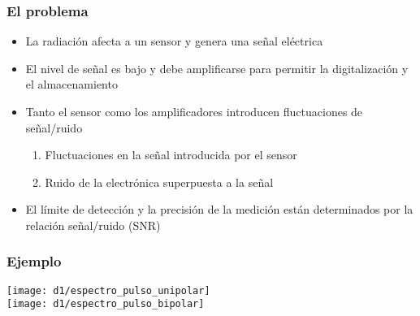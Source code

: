 \documentclass{beamer}
\begin{document}
\begin{frame}
\frametitle{El problema}
\begin{alertblock}{}
\begin{itemize}[<+->]
\item La radiaci\'on afecta a un sensor y genera una señal el\'ectrica

\item El nivel de señal es bajo y debe amplificarse para permitir la digitalizaci\'on y
el almacenamiento

\item Tanto el sensor como los amplificadores introducen fluctuaciones de señal/ruido
\begin{enumerate}
\item Fluctuaciones en la señal introducida por el sensor
\item Ruido de la electr\'onica superpuesta a la señal
\end{enumerate}

\item El l\'imite de detecci\'on y la precisi\'on de la medici\'on est\'an
determinados por la relaci\'on señal/ruido (SNR)
\end{itemize}
\end{alertblock}

\end{frame}

\begin{frame}
\frametitle{Ejemplo}
\begin{block}{}
\texttt{[image: d1/espectro\_pulso\_unipolar]} \\
\texttt{[image: d1/espectro\_pulso\_bipolar]} 
\end{block}
\end{frame} 
\end{document}
